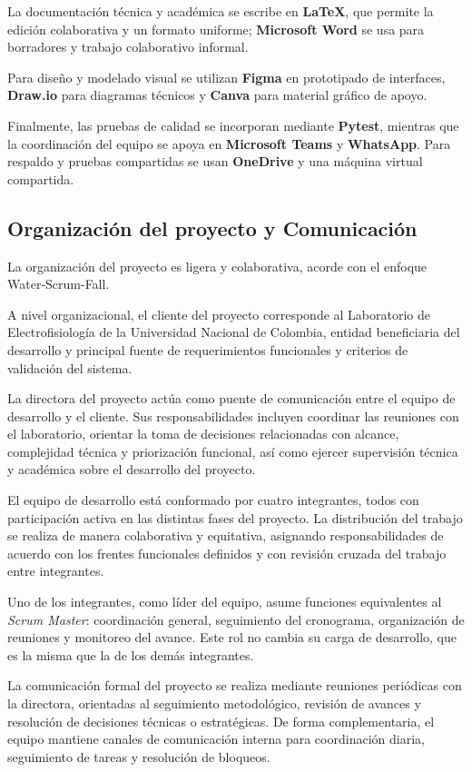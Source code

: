 \documentclass{article}
\begin{document}
La documentación técnica y académica se escribe en \textbf{LaTeX}, que permite la edición colaborativa y un formato uniforme; \textbf{Microsoft Word} se usa para borradores y trabajo colaborativo informal.

Para diseño y modelado visual se utilizan \textbf{Figma} en prototipado de interfaces, \textbf{Draw.io} para diagramas técnicos y \textbf{Canva} para material gráfico de apoyo.

Finalmente, las pruebas de calidad se incorporan mediante \textbf{Pytest}, mientras que la coordinación del equipo se apoya en \textbf{Microsoft Teams} y \textbf{WhatsApp}. Para respaldo y pruebas compartidas se usan \textbf{OneDrive} y una máquina virtual compartida.

\subsection{Organización del proyecto y Comunicación}

La organización del proyecto es ligera y colaborativa, acorde con el enfoque Water-Scrum-Fall.

A nivel organizacional, el cliente del proyecto corresponde al Laboratorio de Electrofisiología de la Universidad Nacional de Colombia, entidad beneficiaria del desarrollo y principal fuente de requerimientos funcionales y criterios de validación del sistema.

La directora del proyecto actúa como puente de comunicación entre el equipo de desarrollo y el cliente. Sus responsabilidades incluyen coordinar las reuniones con el laboratorio, orientar la toma de decisiones relacionadas con alcance, complejidad técnica y priorización funcional, así como ejercer supervisión técnica y académica sobre el desarrollo del proyecto. 

El equipo de desarrollo está conformado por cuatro integrantes, todos con participación activa en las distintas fases del proyecto. La distribución del trabajo se realiza de manera colaborativa y equitativa, asignando responsabilidades de acuerdo con los frentes funcionales definidos y con revisión cruzada del trabajo entre integrantes.

Uno de los integrantes, como líder del equipo, asume funciones equivalentes al \textit{Scrum Master}: coordinación general, seguimiento del cronograma, organización de reuniones y monitoreo del avance. Este rol no cambia su carga de desarrollo, que es la misma que la de los demás integrantes.

La comunicación formal del proyecto se realiza mediante reuniones periódicas con la directora, orientadas al seguimiento metodológico, revisión de avances y resolución de decisiones técnicas o estratégicas. De forma complementaria, el equipo mantiene canales de comunicación interna para coordinación diaria, seguimiento de tareas y resolución de bloqueos.
\end{document}
